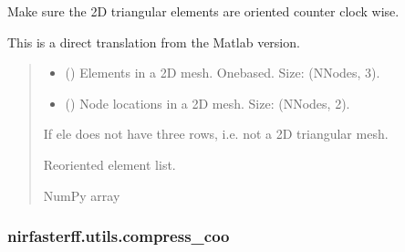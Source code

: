 \documentclass[letterpaper,10pt,english]{sphinxmanual}
\begin{document}
\begin{fulllineitems}
\label{\detokenize{_autosummary/nirfasterff.utils.check_element_orientation_2d:nirfasterff.utils.check_element_orientation_2d}}
\pysigstartsignatures
\pysiglinewithargsret
{}
{\sphinxparamcomma {}}
{}
\pysigstopsignatures
\sphinxAtStartPar
Make sure the 2D triangular elements are oriented counter clock wise.

\sphinxAtStartPar
This is a direct translation from the Matlab version.
\begin{quote}\begin{description}
\begin{itemize}
\item {} 
\sphinxAtStartPar
{} () \textendash{} Elements in a 2D mesh. One\sphinxhyphen{}based. Size: (NNodes, 3).

\item {} 
\sphinxAtStartPar
{} () \textendash{} Node locations in a 2D mesh. Size: (NNodes, 2).

\end{itemize}

\sphinxAtStartPar
{} \textendash{} If ele does not have three rows, i.e. not a 2D triangular mesh.

\sphinxAtStartPar
{} \textendash{} Re\sphinxhyphen{}oriented element list.

\sphinxAtStartPar
NumPy array

\end{description}\end{quote}

\end{fulllineitems}


\sphinxstepscope


\subsubsection{nirfasterff.utils.compress\_coo}
\label{\detokenize{_autosummary/nirfasterff.utils.compress_coo:nirfasterff-utils-compress-coo}}\label{\detokenize{_autosummary/nirfasterff.utils.compress_coo::doc}}
\end{document}
